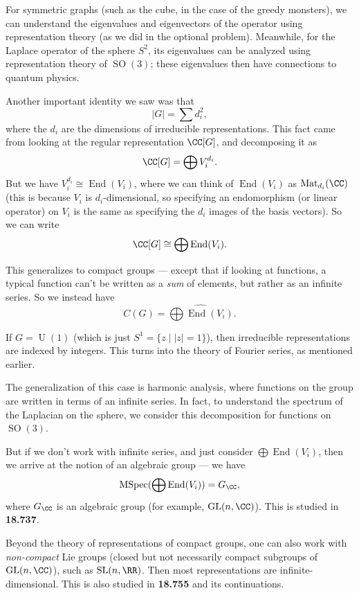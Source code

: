 For symmetric graphs (such as the cube, in the case of the greedy monsters), we can understand the eigenvalues and eigenvectors of the operator using representation theory (as we did in the optional problem). Meanwhile, for the Laplace operator of the sphere $S^2$, its eigenvalues can be analyzed using representation theory of $\operatorname{SO}(3)$; these eigenvalues then have connections to quantum physics. 

Another important identity we saw was that \[\lvert G \rvert = \sum d_i^2,\] where the $d_i$ are the dimensions of irreducible representations. This fact came from looking at the regular representation $\CC[G]$, and decomposing it as \[\CC[G] = \bigoplus V_i^{d_i}.\] But we have $V_i^{d_i} \cong \operatorname{End}(V_i)$, where we can think of $\operatorname{End}(V_i)$ as $\operatorname{Mat}_{d_i}(\CC)$ (this is because $V_i$ is $d_i$-dimensional, so specifying an endomorphism (or linear operator) on $V_i$ is the same as specifying the $d_i$ images of the basis vectors). So we can write \[\CC[G] \cong \bigoplus \operatorname{End}(V_i).\] 

This generalizes to compact groups --- except that if looking at functions, a typical function can't be written as a \emph{sum} of elements, but rather as an infinite series. So we instead have \[C(G) = \widehat{\bigoplus \operatorname{End}(V_i)}.\] 

\begin{example}
If $G = \operatorname{U}(1)$ (which is just $S^1 = \{z \mid \lvert z \rvert = 1\}$), then irreducible representations are indexed by integers. This turns into the theory of Fourier series, as mentioned earlier.
\end{example}

The generalization of this case is harmonic analysis, where functions on the group are written in terms of an infinite series. In fact, to understand the spectrum of the Laplacian on the sphere, we consider this decomposition for functions on $\operatorname{SO}(3)$. 

But if we don't work with infinite series, and just consider $\bigoplus \operatorname{End}(V_i)$, then we arrive at the notion of an algebraic group --- we have \[\operatorname{MSpec}(\bigoplus \operatorname{End}(V_i)) = G_{\CC},\] where $G_{\CC}$ is an algebraic group (for example, $\operatorname{GL}(n, \CC)$). This is studied in \textbf{18.737}. 

Beyond the theory of representations of compact groups, one can also work with \emph{non-compact} Lie groups (closed but not necessarily compact subgroups of $\operatorname{GL}(n, \CC)$), such as $\operatorname{SL}(n, \RR)$. Then most representations are infinite-dimensional. This is also studied in \textbf{18.755} and its continuations. 

